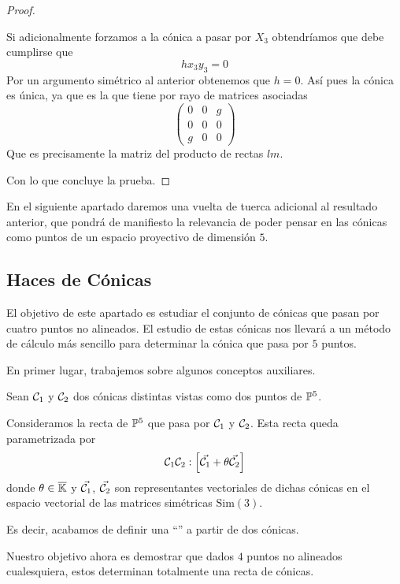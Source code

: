\begin{proof}
\begin{enumerate}
		Si adicionalmente forzamos a la cónica a pasar por $X_3$ obtendríamos que debe cumplirse que
		\begin{equation*}
			hx_3y_3=0
		\end{equation*}
	Por un argumento simétrico al anterior obtenemos que $h=0$.
	Así pues la cónica es única, ya que es la que tiene por rayo de matrices asociadas
	\begin{equation}
		\begin{pmatrix}
		0 & 0 & g\\
		0 & 0 & 0\\
		g & 0 & 0
		\end{pmatrix}
	\end{equation}
	Que es precisamente la matriz del producto de rectas $lm$.
	\end{enumerate}
Con lo que concluye la prueba.
\end{proof}
En el siguiente apartado daremos una vuelta de tuerca adicional al resultado anterior, que pondrá de manifiesto la relevancia de poder pensar en las cónicas como puntos de un espacio proyectivo de dimensión $5$.
\subsection{Haces de Cónicas}
El objetivo de este apartado es estudiar el conjunto de cónicas que pasan por cuatro puntos no alineados. El estudio de estas cónicas nos llevará a un método de cálculo más sencillo para determinar la cónica que pasa por $5$ puntos.

En primer lugar, trabajemos sobre algunos conceptos auxiliares.
\begin{obs}
Sean $\mathcal{C}_1$ y $\mathcal{C}_2$ dos cónicas distintas vistas como dos puntos de $\mathbb{P}^5$.

Consideramos la recta de $\mathbb{P}^5$ que pasa por $\mathcal{C}_1$ y $\mathcal{C}_2$. Esta recta queda parametrizada por
\begin{equation}
	\mathcal{C}_1\mathcal{C}_2:\left [ \vec{\mathcal{C}_1}+\theta\vec{\mathcal{C}_2} \right ]
\end{equation}
donde $\theta\in\overline{\mathbb{K}}$ y $\vec{\mathcal{C}_1}$, $\vec{\mathcal{C}_2}$ son representantes vectoriales de dichas cónicas en el espacio vectorial de las matrices simétricas $\mathrm{Sim}(3)$.

Es decir, acabamos de definir una ``'' a partir de dos cónicas.
\end{obs}
Nuestro objetivo ahora es demostrar que dados $4$ puntos no alineados cualesquiera, estos determinan totalmente una recta de cónicas.

